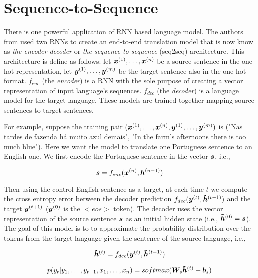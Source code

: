 \section{Sequence-to-Sequence}
\label{sec:Seq2seq}

There is one powerful application of RNN based language model. The authors from \cite{Sustskever} used two RNNs to create an end-to-end translation model that is now know as \textit{the encoder-decoder} or \textit{the sequence-to-sequence} (seq2seq) architecture. This architecture is define as follows: let $\bm{x}^{(1)}, \dots, \bm{x}^{(n)}$ be a source sentence in the one-hot representation,  let $\bm{y}^{(1)}, \dots, \bm{y}^{(m)}$ be the target sentence also in the one-hot format. $f_{enc}$ (the \textit{encoder}) is a RNN with the sole purpose of creating a vector representation of input language's sequences. $f_{dec}$ (the \textit{decoder}) is a language model for the target language. These models are trained together mapping source sentences to target sentences.

For example, suppose the training pair $(\bm{x}^{(1)}, \dots, \bm{x}^{(n)}, \bm{y}^{(1)}, \dots, \bm{y}^{(m)})$ is ("Nas tardes de fazenda há muito azul demais", "In the farm’s afternoons there is too much blue"). Here we want the model to translate one Portuguese sentence to an English one. We first encode the Portuguese sentence in the vector $\bm{s}$, i.e.,

\begin{equation}
\bm{s} = f_{enc}(\bm{x}^{(n)}, \bm{h}^{(n-1)})
\end{equation}

Then using the control English sentence as a target, at each time $t$ we compute the cross entropy error between the decoder prediction $f_{dec}(\bm{y}^{(t)}, \bm{\tilde{h}}^{(t-1)})$ and the target $\bm{y}^{(t+1)}$ ($\bm{y}^{(0)}$ is the $<eos>$ token). The decoder uses the vector representation of the source sentence $\bm{s}$ as an initial hidden state (i.e., $\bm{\tilde{h}}^{(0)} = \bm{s}$). The goal of this model is to to approximate the probability distribution over the tokens from the target language given the sentence of the source language, i.e.,

\begin{equation}
\bm{\tilde{h}}^{(t)} = f_{dec}(\bm{y}^{(t)}, \bm{\tilde{h}}^{(t-1)})
\end{equation}

\begin{equation}
\label{decpred}
p(y_t | y_1, \dots, y_{t-1}, x_1, \dots, x_{n}) = softmax(\bm{W}_{s}  \bm{\tilde{h}}^{(t)} + \bm{b}_s)
\end{equation}

